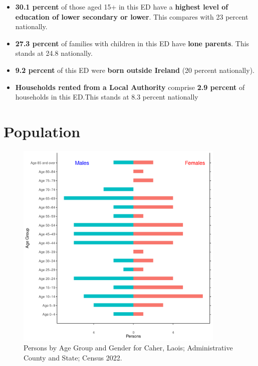 \documentclass{article}
\begin{document}
\begin{itemize}
\item \textbf{30.1 percent} of those aged 15+ in this ED have a \textbf{highest level of education of lower secondary or lower}. This compares with 23 percent nationally. 

\item \textbf{27.3 percent} of families with children in this ED have \textbf{lone parents}. This stands at 24.8 nationally.

\item \textbf{9.2 percent} of this ED were \textbf{born outside Ireland} (20 percent nationally).

\item \textbf{Households rented from a Local Authority} comprise \textbf{2.9 percent} of households in this ED.This stands at 8.3 percent nationally

\end{itemize}

\pagebreak

\section{Population} 
\label{sect:Pop}

\begin{figure}[h]
	\centering
	\includegraphics[width = 100mm]{../figures/PyramidPlot.pdf}
	\caption{Persons by Age Group and Gender for Caher, Laois; Administrative County and State; Census 2022.}
	\label{fig:2ae19629-1a6a-13a3-e055-000000000001}
	\end{figure}
\end{document}
